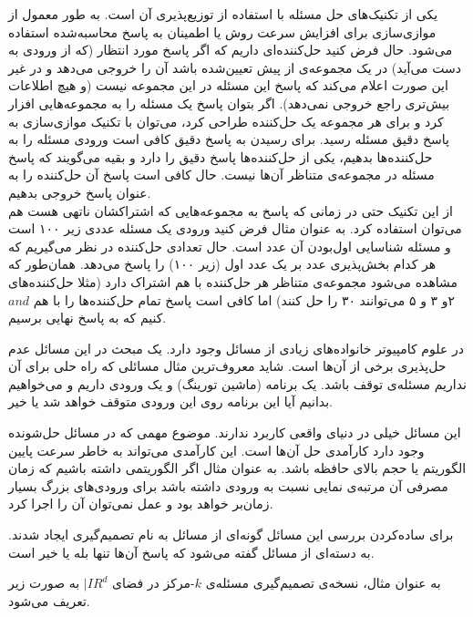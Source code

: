  یکی از تکنیک‌های حل مسئله با استفاده از توزیع‌پذیری آن است. به طور معمول از موازی‌سازی برای افزایش سرعت روش یا اطمینان به پاسخ محاسبه‌شده استفاده می‌شود. حال فرض کنید حل‌کننده‌ای  داریم که اگر پاسخ مورد انتظار (که از ورودی به دست می‌آید) در یک مجموعه‌ی از پیش تعیین‌شده باشد آن را خروجی می‌دهد و در غیر این صورت اعلام می‌کند که پاسخ این مسئله در این مجموعه نیست (و هیچ اطلاعات بیش‌تری راجع خروجی نمی‌دهد). اگر بتوان پاسخ یک مسئله را به مجموعه‌هایی افزار کرد و برای هر مجموعه یک حل‌کننده طراحی کرد، می‌توان با تکنیک موازی‌سازی به پاسخ دقیق مسئله رسید. برای رسیدن به پاسخ دقیق کافی است ورودی مسئله را به حل‌کننده‌ها بدهیم، یکی از حل‌کننده‌ها پاسخ دقیق را دارد و بقیه می‌گویند که پاسخ مسئله در مجموعه‌ی متناظر آن‌ها نیست. حال کافی است پاسخ آن حل‌کننده را به عنوان پاسخ خروجی بدهیم.\\
از این تکنیک حتی در زمانی که پاسخ به مجموعه‌هایی که اشتراکشان ناتهی هست هم می‌توان استفاده کرد. به عنوان مثال فرض کنید ورودی یک مسئله عددی زیر ۱۰۰ است و مسئله شناسایی اول‌بودن آن عدد است. حال تعدادی حل‌کننده در نظر می‌گیریم که هر کدام بخش‌پذیری عدد بر یک عدد اول (زیر ۱۰۰) را پاسخ می‌دهد. همان‌طور که مشاهده می‌شود مجموعه‌ی متناظر هر حل‌کننده با هم اشتراک دارد (مثلا حل‌کننده‌های ۲و ۳ و ۵ می‌توانند ۳۰ را حل کنند) اما کافی است پاسخ تمام حل‌کننده‌ها را با هم $and$ کنیم که به پاسخ نهایی برسیم.



در علوم کامپیوتر خانواده‌های زیادی از مسائل وجود دارد. یک مبحث در این مسائل عدم حل‌پذیری برخی از آن‌ها است. شاید معروف‌ترین مثال مسائلی که راه حلی برای آن نداریم مسئله‌ی توقف باشد. یک برنامه (ماشین تورینگ) و یک ورودی داریم و می‌خواهیم بدانیم آیا این برنامه روی این ورودی متوقف خواهد شد یا خیر. 

این مسائل خیلی در دنیای واقعی کاربرد ندارند. موضوع مهمی که در مسائل حل‌شونده وجود دارد کارآمدی حل آن‌ها است. این کارآمدی می‌تواند به خاطر سرعت پایین الگوریتم یا حجم بالای حافظه باشد. به عنوان مثال اگر الگوریتمی داشته باشیم که زمان مصرفی آن مرتبه‌ی نمایی نسبت به ورودی داشته باشد برای ورودی‌های بزرگ بسیار زمان‌بر خواهد بود و عمل نمی‌توان آن را اجرا کرد.

برای ساده‌کردن بررسی این مسائل گونه‌ای از مسائل به نام تصمیم‌گیری ایجاد شدند.
 به دسته‌ای از مسائل گفته می‌شود که پاسخ آن‌ها تنها بله یا خیر است.

به عنوان مثال، نسخه‌ی تصمیم‌گیری مسئله‌ی $k$-مرکز در فضای $|IR^d$ به صورت زیر تعریف می‌شود.

